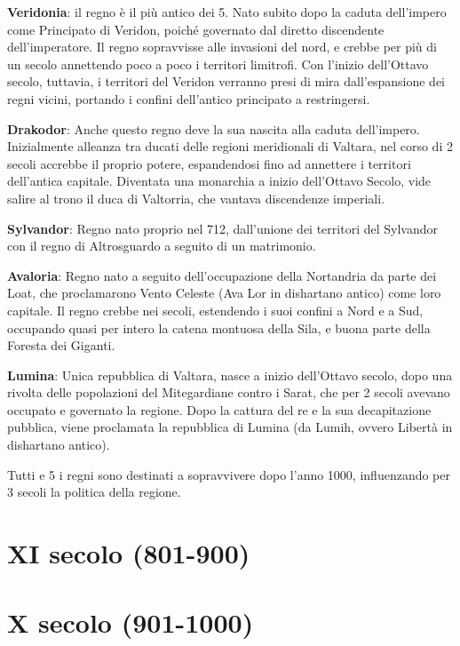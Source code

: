 \textbf{Veridonia}: il regno è il più antico dei 5. Nato subito dopo la
caduta dell'impero come Principato di Veridon, poiché governato dal
diretto discendente dell'imperatore. Il regno sopravvisse alle invasioni
del nord, e crebbe per più di un secolo annettendo poco a poco i
territori limitrofi. Con l'inizio dell'Ottavo secolo, tuttavia, i
territori del Veridon verranno presi di mira dall'espansione dei regni
vicini, portando i confini dell'antico principato a restringersi.

\textbf{Drakodor}: Anche questo regno deve la sua nascita alla caduta
dell'impero. Inizialmente alleanza tra ducati delle regioni meridionali
di Valtara, nel corso di 2 secoli accrebbe il proprio potere,
espandendosi fino ad annettere i territori dell'antica capitale.
Diventata una monarchia a inizio dell'Ottavo Secolo, vide salire al
trono il duca di Valtorria, che vantava discendenze imperiali.

\textbf{Sylvandor}: Regno nato proprio nel 712, dall'unione dei
territori del Sylvandor con il regno di Altrosguardo a seguito di un
matrimonio.

\textbf{Avaloria}: Regno nato a seguito dell'occupazione della
Nortandria da parte dei Loat, che proclamarono Vento Celeste (Ava Lor in
dishartano antico) come loro capitale. Il regno crebbe nei secoli,
estendendo i suoi confini a Nord e a Sud, occupando quasi per intero la
catena montuosa della Sila, e buona parte della Foresta dei Giganti.

\textbf{Lumina}: Unica repubblica di Valtara, nasce a inizio dell'Ottavo
secolo, dopo una rivolta delle popolazioni del Mitegardiane contro i
Sarat, che per 2 secoli avevano occupato e governato la regione. Dopo la
cattura del re e la sua decapitazione pubblica, viene proclamata la
repubblica di Lumina (da Lumih, ovvero Libertà in dishartano antico).

Tutti e 5 i regni sono destinati a sopravvivere dopo l'anno 1000,
influenzando per 3 secoli la politica della regione.

\section{XI secolo (801-900)}\label{xi-secolo-801-900}

\section{X secolo (901-1000)}\label{x-secolo-901-1000}

